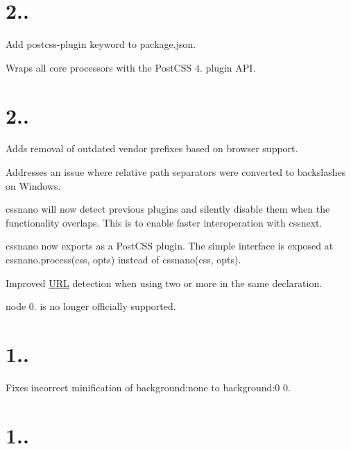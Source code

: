 \section*{2..}


\begin{DoxyItemize}
\item Add {\ttfamily postcss-\/plugin} keyword to package.\+json.
\item Wraps all core processors with the Post\+C\+SS 4. plugin A\+PI.
\end{DoxyItemize}

\section*{2..}


\begin{DoxyItemize}
\item Adds removal of outdated vendor prefixes based on browser support.
\item Addresses an issue where relative path separators were converted to backslashes on Windows.
\item cssnano will now detect previous plugins and silently disable them when the functionality overlaps. This is to enable faster interoperation with cssnext.
\item cssnano now exports as a Post\+C\+SS plugin. The simple interface is exposed at {\ttfamily cssnano.\+process(css, opts)} instead of {\ttfamily cssnano(css, opts)}.
\item Improved \mbox{\hyperlink{namespace_u_r_l}{U\+RL}} detection when using two or more in the same declaration.
\item node 0. is no longer officially supported.
\end{DoxyItemize}

\section*{1..}


\begin{DoxyItemize}
\item Fixes incorrect minification of {\ttfamily background\+:none} to {\ttfamily background\+:0 0}.
\end{DoxyItemize}

\section*{1..}


